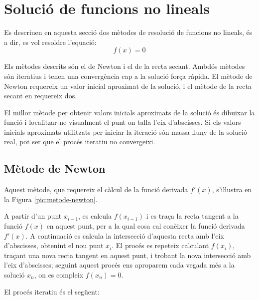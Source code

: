 \section{Solució de funcions no lineals}\label{sec:func-no-lin}

Es descriuen en aquesta secció dos mètodes de resolució de funcions no lineals, és a dir, es vol resoldre l'equació: \begin{equation}
   f(x) = 0 \end{equation}

Els mètodes descrits són el de Newton i el de la recta secant. Ambdós mètodes són iteratius i tenen una convergència cap a la solució força ràpida. El mètode de Newton requereix un valor inicial aproximat de la solució, i el mètode de la recta secant en requereix dos.

El millor mètode per obtenir valors inicials aproximats de la solució és dibuixar la funció i localitzar-ne visualment el punt on talla l'eix d'abscisses. Si els valors inicials aproximats utilitzats per iniciar la iteració són massa lluny de la solució real, pot ser que el procés iteratiu no convergeixi.


\subsection{Mètode de Newton}

Aquest mètode, que requereix el càlcul de la funció derivada $f'(x)$, s'iŀlustra en la Figura \vref{pic:metode-newton}.

A partir d'un punt $x_{i-1}$, es calcula $f(x_{i-1})$ i es traça la recta tangent a la funció $f(x)$ en aquest punt, per a la qual cosa cal conèixer la funció derivada $f'(x)$. A continuació es calcula la intersecció d'aquesta recta amb l'eix d'abscisses, obtenint el nou punt $x_i$. El procés es repeteix calculant $f(x_i)$, traçant una nova recta tangent en aquest punt, i trobant la nova intersecció amb l'eix d'abscisses; seguint aquest procés ens aproparem cada vegada més a la solució $x_n$, on es compleix $f(x_n)=0$.

\begin{center}
    
    \label{pic:metode-newton}
\end{center}

El procés iteratiu és el següent:

